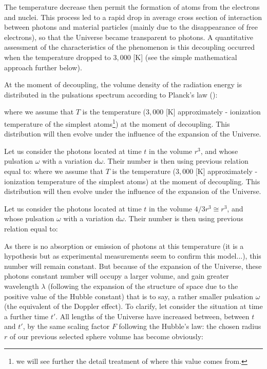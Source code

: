 	The temperature decrease then permit the formation of atoms from the electrons and nuclei. This process led to a rapid drop in average cross section of interaction between photons and material particles (mainly due to the disappearance of free electrons), so that the Universe became transparent to photons. A quantitative assessment of the characteristics of the phenomenon is this decoupling occurred when the temperature dropped to $3,000$ [K] (see the simple mathematical approach further below).

	At the moment of decoupling, the volume density of the radiation energy is distributed in the pulsations spectrum according to Planck's law ():
	
	where we assume that $T$ is the temperature ($3,000$ [K] approximately - ionization temperature of the simplest atoms\footnote{we will see further the detail treatment of where this value comes from.}) at the moment of decoupling. This distribution will then evolve under the influence of the expansion of the Universe.

	Let us consider the photons located at time $t$ in the volume $r^3$, and whose pulsation $\omega$ with a variation $\mathrm{d}\omega$. Their number is then using previous relation equal to:
	where we assume that $T$ is the temperature ($3,000$ [K] approximately - ionization temperature of the simplest atoms) at the moment of decoupling. This distribution will then evolve under the influence of the expansion of the Universe.

	Let us consider the photons located at time $t$ in the volume $4/3r^3\cong r^3$, and whose pulsation $\omega$ with a variation $\mathrm{d}\omega$. Their number is then using previous relation equal to:
	
	As there is no absorption or emission of photons at this temperature (it is a hypothesis but as experimental measurements seem to confirm this model...), this number will remain constant. But because of the expansion of the Universe, these photons constant number will occupy a larger volume, and gain greater wavelength $\lambda$ (following the expansion of the structure of space due to the positive value of the Hubble constant) that is to say, a rather smaller pulsation $\omega$ (the equivalent of the Doppler effect). To clarify, let consider the situation at time a further time $t'$. All lengths of the Universe have increased between, between $t$ and $t'$, by the same scaling factor $F$ following the Hubble's law: the chosen radius $r$ of our previous selected sphere volume has become obviously:
	
